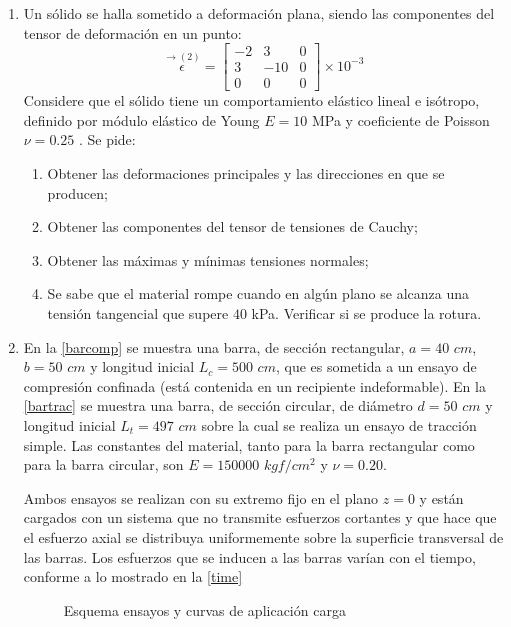 \documentclass[../notas medios.tex]{subfiles}
\begin{document}
\begin{enumerate}
\item \label{punto07_m} Un sólido se halla sometido a deformación plana, siendo las componentes del tensor de deformación en un punto: 
\[\overset{\rightarrow (2)}\epsilon = \left[ \begin{array}{ccc}
-2 & 3 & 0 \\ 
3 & -10 & 0 \\ 
0 & 0 & 0
\end{array}  \right] \times 10^{-3}\]
Considere que el sólido tiene un comportamiento elástico lineal e isótropo, definido por
módulo elástico de Young $E = 10$ MPa y coeficiente de Poisson $\nu = 0.25$ .
Se pide:
\begin{enumerate}
\item Obtener las deformaciones principales y las direcciones en que se producen;
\item Obtener las componentes del tensor de tensiones de Cauchy;
\item Obtener las máximas y mínimas tensiones normales;
\item Se sabe que el material rompe cuando en algún plano se alcanza una tensión tangencial
que supere $40$ kPa. Verificar si se produce la rotura.
\end{enumerate}

\item \label{punto08_m}  En la \cref{barcomp}  se muestra una barra, de sección rectangular, $a= 40$ $cm$, $b = 50$ $cm$ y longitud inicial $L_{c} = 500$ $cm$, que es  sometida a un ensayo de compresión confinada (está contenida en un recipiente indeformable). En la \cref{bartrac} se muestra una barra, de sección circular, de diámetro $d = 50$ $cm$ y longitud inicial $L_{t} =497$ $cm$ sobre la cual se realiza  un ensayo de tracción simple. Las constantes del material, tanto para la barra rectangular como para la barra circular, son $E=150000$ $kgf/cm^2$ y $\nu=0.20$.

Ambos ensayos se realizan con su extremo fijo  en el plano $z = 0$ y están cargados con un sistema que no transmite esfuerzos cortantes y que hace que el esfuerzo axial se distribuya uniformemente sobre la superficie transversal de las barras. Los esfuerzos que se inducen a las barras varían con el tiempo, conforme a lo mostrado en la  \cref{time}
%
\begin{figure}[H]
	\centering
	\caption{Esquema ensayos y curvas de aplicación carga}
	\label{ensayo}
\end{figure}


\end{enumerate}
\end{document}
